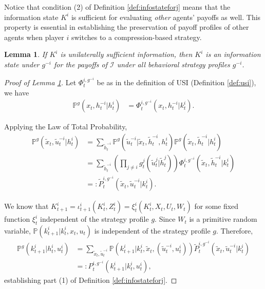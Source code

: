 \documentclass[pdflatex,sn-basic]{sn-jnl}
\renewcommand{\Pr}{\mathbb{P}}
\newcommand{\Comp}{K}
\newcommand{\comp}{k}
\theoremstyle{thmstyleone}%
\newtheorem{lemma}{Lemma}
\theoremstyle{thmstyletwo}%
\theoremstyle{thmstylethree}%
\begin{document}
\begin{appendices}
Notice that condition (2) of Definition \ref{def:infostateforj} means that the information state $K^i$ is sufficient for evaluating \emph{other} agents' payoffs as well. This property is essential in establishing the preservation of payoff profiles of other agents when player $i$ switches to a compression-based strategy.

\begin{lemma}\label{lem:usiisinfostate}
	If $\Comp^i$ is unilaterally sufficient information, then $\Comp^i$ is an information state under $g^{-i}$ for the payoffs of $\mathcal{I}$ under all behavioral strategy profiles $g^{-i}$.
\end{lemma}

\begin{proof}[Proof of Lemma \ref{lem:usiisinfostate}]
	Let $\Phi_t^{i, g^{-i}}$ be as in the definition of USI (Definition \ref{def:usi}), we have
	\begin{align}
		\Pr^g(x_t, h_t^{-i}| h_t^i) &= \Phi_t^{i, g^{-i}}(x_t, h_t^{-i}|\comp_t^i).
	\end{align}
	
	{Applying the Law of Total Probability,}
	\begin{align}
		\Pr^g(\tilde{x}_t, \tilde{u}_t^{-i}|h_t^i) &= \sum_{\tilde{h}_t^{-i}} \Pr^g(\tilde{u}_t^{-i}|\tilde{x}_t, \tilde{h}_t^{-i}, h_t^i) \Pr^g(\tilde{x}_t, \tilde{h}_t^{-i}| h_t^i)\label{eq:usiproof:1} \\
		&= \sum_{\tilde{h}_t^{-i}} \left(\prod_{j\neq i}g_t^j(\tilde{u}_t^j|\tilde{h}_t^j) \right) \Phi_t^{i, g^{-i}}(\tilde{x}_t, \tilde{h}_t^{-i}| \comp_t^i)\\
		&=: \tilde{P}_t^{i, g^{-i}}(\tilde{x}_t, \tilde{u}_t^{-i}|\comp_t^i).
	\end{align}

	{We know that $\Comp_{t+1}^i = \iota_{t+1}^i(\Comp_t^i, Z_t^i) = \xi_t^i(\Comp_t^i, X_t, U_t, W_t)$ for some fixed function $\xi_t^i$ independent of the strategy profile $g$. Since $W_t$ is a primitive random variable, $\Pr(\comp_{t+1}^i | \comp_t^i, x_t, u_t)$ is independent of the strategy profile $g$.} Therefore,
	\begin{align}
		\Pr^g(\comp_{t+1}^i|h_t^i, u_t^i) &= \sum_{\tilde{x}_t, \tilde{u}_t^{-i}} \Pr(\comp_{t+1}^i | \comp_t^i, \tilde{x}_t, (\tilde{u}_t^{-i}, u_t^i)) \tilde{P}_t^{i, g^{-i}}(\tilde{x}_t, \tilde{u}_t^{-i}|\comp_t^i)\\
		&=:P_t^{i, g^{-i}}(\comp_{t+1}^i|\comp_t^i, u_t^i),
	\end{align}
    {establishing part (1) of Definition \ref{def:infostateforj}.}
	

\end{proof}
\end{appendices}
\end{document}
